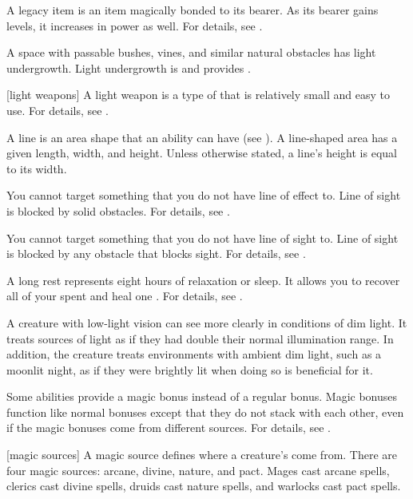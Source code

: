  A legacy item is an item magically bonded to its bearer.
As its bearer gains levels, it increases in power as well.
For details, see .

 A space with passable bushes, vines, and similar natural obstacles has light undergrowth.
Light undergrowth is  and provides .

[light weapons] A light weapon is a type of  that is relatively small and easy to use.
For details, see .

 A line is an area shape that an ability can have (see ).
A line-shaped area has a given length, width, and height.
Unless otherwise stated, a line's height is equal to its width.

 You cannot target something that you do not have line of effect to.
Line of sight is blocked by solid obstacles.
For details, see .

 You cannot target something that you do not have line of sight to.
Line of sight is blocked by any obstacle that blocks sight.
For details, see .

 A long rest represents eight hours of relaxation or sleep.
It allows you to recover all of your spent  and heal one .
For details, see .

 A creature with low-light vision can see more clearly in conditions of dim light.
It treats sources of light as if they had double their normal illumination range.
In addition, the creature treats environments with ambient dim light, such as a moonlit night, as if they were brightly lit when doing so is beneficial for it.

 Some abilities provide a magic bonus instead of a regular bonus.
Magic bonuses function like normal bonuses except that they do not stack with each other, even if the magic bonuses come from different sources.
For details, see .

[magic sources] A magic source defines where a creature's  come from.
There are four magic sources: arcane, divine, nature, and pact.
Mages cast arcane spells, clerics cast divine spells, druids cast nature spells, and warlocks cast pact spells.

